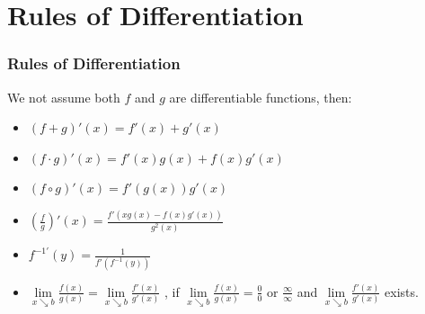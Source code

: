 \documentclass[12pt, t]{beamer}
\begin{document}
\section{Rules of Differentiation}
\begin{frame}
    \frametitle{Rules of Differentiation}
    We not assume both $f$ and $g$ are differentiable functions, then:
    \begin{itemize}
        \item $(f+g)'(x)=f'(x)+g'(x)$
              \vspace{1em}
        \item $(f\cdot g)'(x)=f'(x)g(x)+f(x)g'(x)$
              \vspace{1em}
        \item $(f\circ g)'(x)=f'(g(x))g'(x)$
              \vspace{1em}
        \item $(\frac{f}{g})'(x)=\frac{f'(xg(x)-f(x)g'(x))}{g^2(x)}$
              \vspace{1em}
        \item $f^{-1'}(y)=\frac{1}{f'(f^{-1}(y))}$
              \vspace{1em}
        \item $\underset{x\searrow b}{\lim}\frac{f(x)}{g(x)}=\underset{x\searrow b}{\lim}\frac{f'(x)}{g'(x)}$
              , if $\underset{x\searrow b}{\lim}\frac{f(x)}{g(x)}=\frac{0}{0}\text{ or }\frac{\infty}{\infty}$ and $\underset{x\searrow b}{\lim}\frac{f'(x)}{g'(x)}$ exists.
    \end{itemize}
\end{frame}
\end{document}
